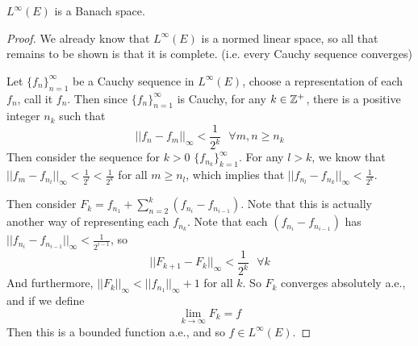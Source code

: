 \begin{pblm} %
	$L^\infty(E)$ is a Banach space. 
\begin{proof}
	We already know that $L^\infty(E)$ is a normed linear space, so all that remains to be shown 
	is that it is complete. (i.e. every Cauchy sequence converges)

	Let $\{f_n\}_{n=1}^\infty$ be a Cauchy sequence in $L^\infty(E)$, choose a representation of each 
	$f_n$, call it $f_n$. Then since $\{f_n\}_{n=1}^\infty$ is Cauchy, for any $k \in \mathbb{Z}^+$, there is 
	a positive integer $n_k$ such that 
	\begin{equation*}
		||f_n - f_m||_\infty < \frac{1}{2^k}~~~\forall m, n \ge n_k
	\end{equation*}
	Then consider the sequence for $k > 0$ $\{f_{n_k}\}_{k=1}^\infty$. For any $l > k$, we know that 
	$||f_m - f_{n_l}||_\infty < \frac{1}{2^l} < \frac{1}{2^k}$ for all $m \ge n_l$, which implies that 
	$||f_{n_l} - f_{n_k}||_\infty < \frac{1}{2^k}$. 

	Then consider $F_k = f_{n_1} + \sum\limits_{n=2}^k (f_{n_i} - f_{n_{i-1}})$. Note that this is actually 
	another way of representing each $f_{n_k}$. Note that each $(f_{n_i} - f_{n_{i-1}})$ has 
	$||f_{n_i} - f_{n_{i-1}}||_\infty < \frac{1}{2^{i-1}}$, so 
	\begin{equation*}
		||F_{k+1} - F_k||_\infty < \frac{1}{2^k} ~~~\forall k
	\end{equation*}
	And furthermore, $||F_k||_\infty < ||f_{n_1}||_\infty + 1$ for all $k$. 
	So $F_k$ converges absolutely a.e., and if we define 
	\begin{equation*}
		\lim\limits_{k\to\infty}F_k = f
	\end{equation*}
	Then this is a bounded function a.e., and so $f \in L^\infty(E)$. 


\end{proof}
\end{pblm}
